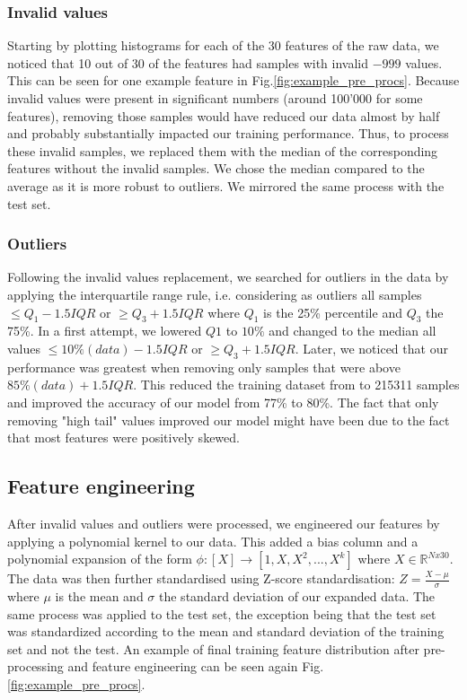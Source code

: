 \documentclass[10pt,conference,compsocconf]{IEEEtran}
\begin{document}
\subsubsection{Invalid values}\label{subsubsec:invalid_values}
Starting by plotting histograms for each of the 30 features of the raw data, we noticed that 10 out of 30 of the features had samples with invalid $-999$ values.   This can be
seen for one example feature in Fig.\ref{fig:example_pre_procs}. Because invalid values were present in significant numbers (around 100'000 for some features), removing those samples would have reduced our data almost by half and probably substantially impacted our training performance. Thus, to process these invalid samples, we replaced them with the median of the corresponding features without the invalid samples. We chose the median compared to the average as it is more robust to outliers. We mirrored the same process with the test set.
\subsubsection{Outliers}\label{subsubsec:outliers}
  Following the invalid values replacement, we searched for outliers in the data by applying the interquartile range rule, i.e. considering as outliers all samples $\leq Q_1-1.5IQR$ or $\geq Q_3+1.5IQR$ where $Q_1$ is the 25\% percentile and $Q_3$ the 75\%. In a first attempt, we lowered $Q1$ to $10\%$ and changed to the median all values $\leq 10\%(data)-1.5IQR$ or $\geq Q_3+1.5IQR$. Later, we noticed that our performance was greatest when removing only samples that were above  $85\%(data)+1.5IQR$. This reduced the training dataset from to 215311 samples and improved the accuracy of our model from 77\% to 80\%. The fact  that only removing "high tail" values improved our model might have been due to the fact that most features were positively skewed.  
  \subsection{Feature engineering}\label{subsec: feature_generation}
    After invalid values and outliers were processed, we engineered our features by applying a polynomial kernel to our data. This added a bias column and a polynomial expansion of the form $\phi:[X]\rightarrow [1, X, X^2,...,X^k]$ where $X\in \mathbb{R}^{Nx30}$. The data was then further standardised using Z-score standardisation: $Z = \frac{X - \mu}{\sigma}$ where $\mu$ is the mean and $\sigma$ the standard deviation of our expanded data. The same process was applied to the test set, the exception being that the test set was standardized according to the mean and standard deviation of the training set and not the test. An example of final training feature distribution after pre-processing and feature engineering can be seen again Fig.\ref{fig:example_pre_procs}.
    
\end{document}
